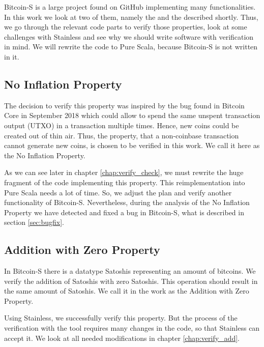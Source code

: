 Bitcoin-S is a large project found on GitHub implementing many functionalities.
In this work we look at two of them, namely the  and the  described shortly.
Thus, we go through the relevant code parts to verify those properties, look at some challenges with Stainless and see why we should write software with verification in mind.
We will rewrite the code to Pure Scala, because Bitcoin-S is not written in it.


\subsection{No Inflation Property}
\label{property_1}
The decision to verify this property was inspired by the bug found in Bitcoin Core in September 2018  \cite{cve201817144} which could allow to spend the same unspent transaction output (UTXO) in a transaction multiple times.
Hence, new coins could be created out of thin air.
Thus, the property, that a non-coinbase transaction cannot generate new coins, is chosen to be verified in this work.
We call it here as the No Inflation Property.

As we can see later in chapter \ref{chap:verify_check}, we must rewrite the huge fragment of the code implementing this property.
This reimplementation into Pure Scala needs a lot of time.
So, we adjust the plan and verify another functionality of Bitcoin-S.
Nevertheless, during the analysis of the No Inflation Property we have detected and fixed a bug in Bitcoin-S, what is described in section \ref{sec:bugfix}. 


\subsection{Addition with Zero Property}
\label{property_2}
In Bitcoin-S there is a datatype Satoshis representing an amount of bitcoins.
We verify the addition of Satoshis with zero Satoshis.
This operation should result in the same amount of Satoshis.
We call it in the work as the Addition with Zero Property.

Using Stainless, we successfully verify this property.
But the process of the verification with the tool requires many changes in the code, so that Stainless can accept it.
We look at all needed modifications in chapter \ref{chap:verify_add}.
